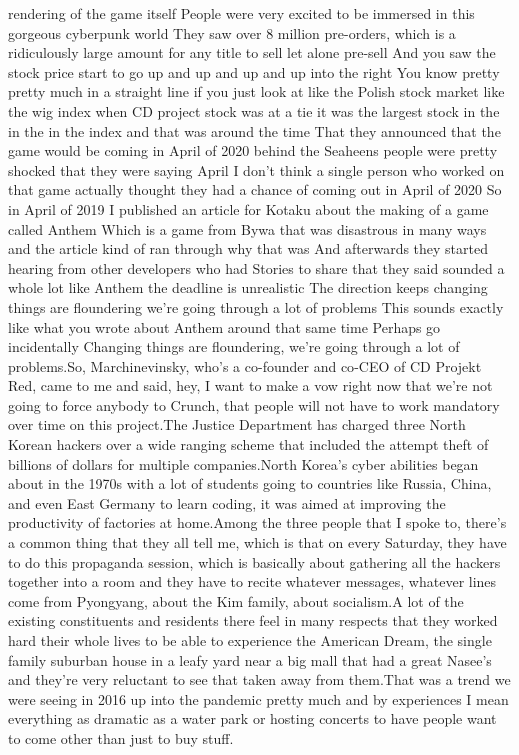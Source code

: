 \documentclass{article}%
\begin{document}
rendering of the game itself People were very excited to be immersed in this gorgeous cyberpunk world They saw over 8 million pre{-}orders, which is a ridiculously large amount for any title to sell let alone pre{-}sell And you saw the stock price start to go up and up and up and up into the right You know pretty pretty much in a straight line if you just look at like the Polish stock market like the wig index when CD project stock was at a tie it was the largest stock in the in the in the index and that was around the time That they announced that the game would be coming in April of 2020 behind the Seaheens people were pretty shocked that they were saying April I don't think a single person who worked on that game actually thought they had a chance of coming out in April of 2020 So in April of 2019 I published an article for Kotaku about the making of a game called Anthem Which is a game from Bywa that was disastrous in many ways and the article kind of ran through why that was And afterwards they started hearing from other developers who had Stories to share that they said sounded a whole lot like Anthem the deadline is unrealistic The direction keeps changing things are floundering we're going through a lot of problems This sounds exactly like what you wrote about Anthem around that same time Perhaps go incidentally  Changing things are floundering, we're going through a lot of problems.So, Marchinevinsky, who's a co{-}founder and co{-}CEO of CD Projekt Red, came to me and said, hey, I want to make a vow right now that we're not going to force anybody to Crunch, that people will not have to work mandatory over time on this project.The Justice Department has charged three North Korean hackers over a wide ranging scheme that included the attempt theft of billions of dollars for multiple companies.North Korea's cyber abilities began about in the 1970s with a lot of students going to countries like Russia, China, and even East Germany to learn coding, it was aimed at improving the productivity of factories at home.Among the three people that I spoke to, there's a common thing that they all tell me, which is that on every Saturday, they have to do this propaganda session, which is basically about gathering all the hackers together into a room and they have to recite whatever messages, whatever lines come from Pyongyang, about the Kim family, about socialism.A lot of the existing constituents and residents there feel in many respects that they worked hard their whole lives to be able to experience the American Dream, the single family suburban house in a leafy yard near a big mall that had a great Nasee's and they're very reluctant to see that taken away from them.That was a trend we were seeing in 2016 up into the pandemic pretty much and by experiences I mean everything as dramatic as a water park or hosting concerts to have people want to come other than just to buy stuff.%
\end{document}
